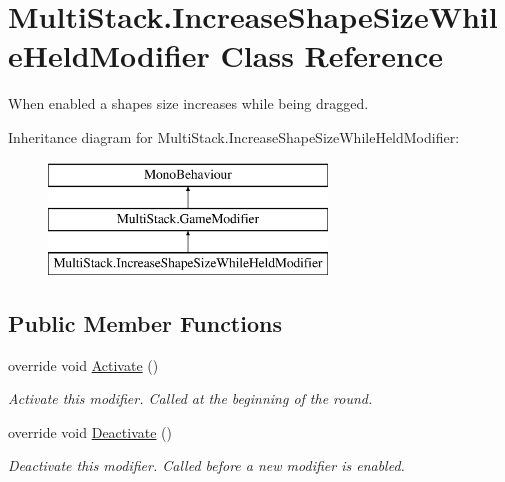 \hypertarget{class_multi_stack_1_1_increase_shape_size_while_held_modifier}{}\section{Multi\+Stack.\+Increase\+Shape\+Size\+While\+Held\+Modifier Class Reference}
\label{class_multi_stack_1_1_increase_shape_size_while_held_modifier}


When enabled a shapes size increases while being dragged.  


Inheritance diagram for Multi\+Stack.\+Increase\+Shape\+Size\+While\+Held\+Modifier\+:\begin{figure}[H]
\begin{center}
\leavevmode
\includegraphics[height=3.000000cm]{class_multi_stack_1_1_increase_shape_size_while_held_modifier}
\end{center}
\end{figure}
\subsection*{Public Member Functions}
\begin{DoxyCompactItemize}
\item 
override void \hyperlink{class_multi_stack_1_1_increase_shape_size_while_held_modifier_a85f9b349e3654575248f7d8b4a14868e}{Activate} ()
\begin{DoxyCompactList}\small\item\em Activate this modifier. Called at the beginning of the round. \end{DoxyCompactList}\item 
override void \hyperlink{class_multi_stack_1_1_increase_shape_size_while_held_modifier_a936b7d337b1aa5febcfd6eb2ad37a016}{Deactivate} ()
\begin{DoxyCompactList}\small\item\em Deactivate this modifier. Called before a new modifier is enabled. \end{DoxyCompactList}\end{DoxyCompactItemize}
